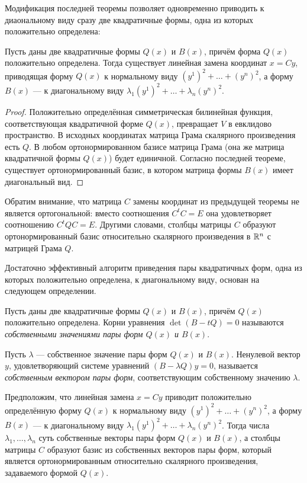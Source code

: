 Модификация последней теоремы позволяет одновременно приводить к диаональному виду сразу две квадратичные формы, одна из которых положительно определена:

\begin{theorem}
    Пусть даны две квадратичные формы $Q(x)$ и $B(x)$, причём форма $Q(x)$ положительно определена. Тогда существует линейная замена координат $x = Cy$, приводящая форму $Q(x)$ к нормальному виду $(y^1)^2 + \ldots + (y^n)^2$, а форму $B(x)$ --- к диагональному виду $\lambda_1(y^1)^2 + \ldots + \lambda_n(y^n)^2$.
\end{theorem}

\begin{proof}
    Положительно определённая симметрическая билинейная функция, соответствующая квадратичной форме $Q(x)$, превращает $V$ в евклидово пространство. В исходных координатах матрица Грама скалярного произведения есть $Q$. В любом ортонормированном базисе матрица Грама (она же матрица квадратичной формы $Q(x)$) будет единичной. Согласно последней теореме, существует ортонормированный базис, в котором матрица формы $B(x)$ имеет диагональный вид.
\end{proof}

Обратим внимание, что матрица $C$ замены координат из предыдущей теоремы не является ортогональной: вместо соотношения $C^tC = E$ она удовлетворяет соотношению $C^tQC = E$. Другими словами, столбцы матрицы $C$ образуют ортонормированный базис относительно скалярного произведения в $\mathbb{R}^n$ с матрицей Грама $Q$.

Достаточно эффективный алгоритм приведения пары квадратичных форм, одна из которых положительно определена, к диагональному виду, основан на следующем определении.

\begin{definition}
    Пусть даны две квадратичные формы $Q(x)$ и $B(x)$, причём $Q(x)$ положительно определена. Корни уравнения $\det(B - tQ) = 0$ называются \textit{собственными значениями пары форм $Q(x)$ и $B(x)$}.
\end{definition}

Пусть $\lambda$ --- собственное значение пары форм $Q(x)$ и $B(x)$. Ненулевой вектор $y$, удовлетворяющий системе уравнений $(B - \lambda Q)y = 0$, называется \textit{собственным вектором пары форм}, соответствующим собственному значению $\lambda$.

\begin{theorem}
    Предположим, что линейная замена $x = Cy$ приводит положительно определённую форму $Q(x)$ к нормальному виду $(y^1)^2 + \ldots + (y^n)^2$, а форму $B(x)$ --- к диагональному виду $\lambda_1(y^1)^2 + \ldots + \lambda_n(y^n)^2$. Тогда числа $\lambda_1, \ldots, \lambda_n$ суть собственные векторы пары форм $Q(x)$ и $B(x)$, а столбцы матрицы $C$ образуют базис из собственных векторов пары форм, который является ортонормированным относительно скалярного произведения, задаваемого формой $Q(x)$.
\end{theorem}

